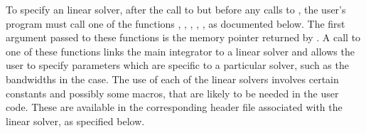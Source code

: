 To specify an {\ida} linear solver, after the call to 
but before any calls to , the user's program must call one
of the functions , , , , ,
as documented below. The first argument passed to these functions is the {\ida}
memory pointer returned by .  A call to one of these
functions links the main {\ida} integrator to a linear solver and
allows the user to specify parameters which are specific to a
particular solver, such as the bandwidths in the {\idaband} case.
The use of each of the linear solvers involves certain constants and possibly 
some macros, that are likely to be needed in the user code.  These are
available in the corresponding header file associated with the linear
solver, as specified below.

